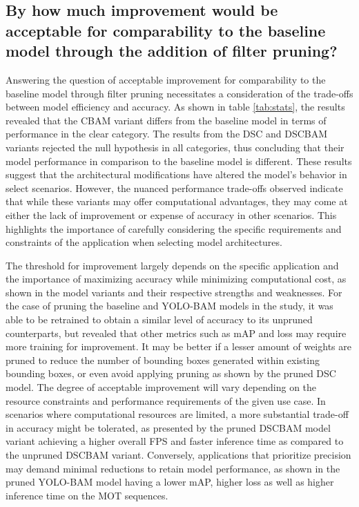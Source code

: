 \subsection{By how much improvement would be acceptable for comparability to the baseline model through the addition of filter pruning?}
Answering the question of acceptable improvement for comparability to the baseline model through filter pruning necessitates a consideration of the trade-offs between model efficiency and accuracy. As shown in table \ref{tab:stats}, the results revealed that the CBAM variant differs from the baseline model in terms of performance in the clear category. The results from the DSC and DSCBAM variants rejected the null hypothesis in all categories, thus concluding that their model performance in comparison to the baseline model is different. These results suggest that the architectural modifications have altered the model's behavior in select scenarios. However, the nuanced performance trade-offs observed indicate that while these variants may offer computational advantages, they may come at either the lack of improvement or expense of accuracy in other scenarios. This highlights the importance of carefully considering the specific requirements and constraints of the application when selecting model architectures. 

The threshold for improvement largely depends on the specific application and the importance of maximizing accuracy while minimizing computational cost, as shown in the model variants and their respective strengths and weaknesses. For the case of pruning the baseline and YOLO-BAM models in the study, it was able to be retrained to obtain a similar level of accuracy to its unpruned counterparts, but revealed that other metrics such as mAP and loss may require more training for improvement. It may be better if a lesser amount of weights are pruned to reduce the number of bounding boxes generated within existing bounding boxes, or even avoid applying pruning as shown by the pruned DSC model. The degree of acceptable improvement will vary depending on the resource constraints and performance requirements of the given use case. In scenarios where computational resources are limited, a more substantial trade-off in accuracy might be tolerated, as presented by the pruned DSCBAM model variant achieving a higher overall FPS and faster inference time as compared to the unpruned DSCBAM variant. Conversely, applications that prioritize precision may demand minimal reductions to retain model performance, as shown in the pruned YOLO-BAM model having a lower mAP, higher loss as well as higher inference time on the MOT sequences.